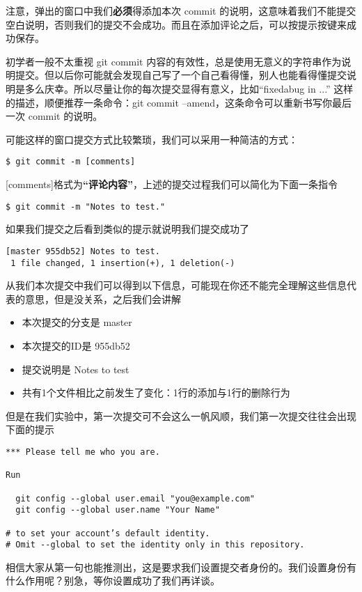 注意，弹出的窗口中我们\textbf{必须}得添加本次 commit 的说明，这意味着我们不能提交空白说明，否则我们的提交不会成功。而且在添加评论之后，可以按提示按键来成功保存。

\begin{note}
初学者一般不太重视 git commit 内容的有效性，总是使用无意义的字符串作为说明提交。但以后你可能就会发现自己写了一个自己看得懂，别人也能看得懂提交说明是多么庆幸。所以尽量让你的每次提交显得有意义，比如“fixedabug in ...” 这样的描述，顺便推荐一条命令：git commit --amend，这条命令可以重新书写你最后一次 commit 的说明。
\end{note}

可能这样的窗口提交方式比较繁琐，我们可以采用一种简洁的方式：
\begin{verbatim}
$ git commit -m [comments]
\end{verbatim}
[comments]格式为\textbf{“评论内容”}，上述的提交过程我们可以简化为下面一条指令
\begin{verbatim}
$ git commit -m "Notes to test."
\end{verbatim}
如果我们提交之后看到类似的提示就说明我们提交成功了
\begin{verbatim}
[master 955db52] Notes to test.
 1 file changed, 1 insertion(+), 1 deletion(-)
\end{verbatim}
从我们本次提交中我们可以得到以下信息，可能现在你还不能完全理解这些信息代表的意思，但是没关系，之后我们会讲解

\begin{itemize}
\item 本次提交的分支\label{分支}是 master
\item 本次提交的ID是 955db52
\item 提交说明是 Notes to test
\item 共有1个文件相比之前发生了变化：1行的添加与1行的删除行为
\end{itemize}

但是在我们实验中，第一次提交可不会这么一帆风顺，我们第一次提交往往会出现 下面的提示
\begin{verbatim}
*** Please tell me who you are.

Run

  git config --global user.email "you@example.com"
  git config --global user.name "Your Name"

# to set your account’s default identity.
# Omit --global to set the identity only in this repository.
\end{verbatim}

相信大家从第一句也能推测出，这是要求我们设置提交者身份的。我们设置身份有 什么作用呢？别急，等你设置成功了我们再详谈。


